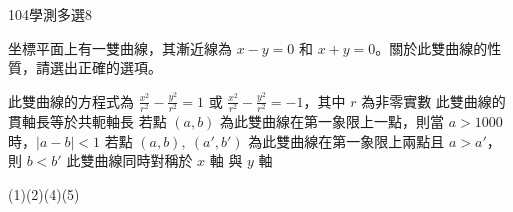     \begin{QUESTION}
        \begin{ExamInfo}{104}{學測}{多選}{8}
        \end{ExamInfo}
        \begin{ExamAnsRateInfo}{48}{71}{49}{24}
        \end{ExamAnsRateInfo}
        \begin{QBODY}
            坐標平面上有一雙曲線，其漸近線為 $x-y=0$ 和 $x+y=0$。關於此雙曲線的性質，請選出正確的選項。
			\begin{QOPS}
				\QOP 此雙曲線的方程式為 $\frac{{{x}^{2}}}{{{r}^{2}}}-\frac{{{y}^{2}}}{{{r}^{2}}}=1$ 或 $\frac{{{x}^{2}}}{{{r}^{2}}}-\frac{{{y}^{2}}}{{{r}^{2}}}=-1$，其中 $r$ 為非零實數
				\QOP 此雙曲線的貫軸長等於共軛軸長
				\QOP 若點 $\left( a,b \right)$ 為此雙曲線在第一象限上一點，則當 $a>1000$ 時，$\left| a-b \right|<1$
				\QOP 若點 $\left( a,b \right),\ \left( a',b' \right)$ 為此雙曲線在第一象限上兩點且 $a>a'$，則 $b<b'$
				\QOP 此雙曲線同時對稱於 $x$ 軸 與 $y$ 軸
			\end{QOPS}
        \end{QBODY}
        \begin{QFROMS}
        \end{QFROMS}
        \begin{QTAGS}\end{QTAGS}
        \begin{QANS}
            (1)(2)(4)(5)
        \end{QANS}
        \begin{QSOLLIST}
        \end{QSOLLIST}
        \begin{QEMPTYSPACE}
        \end{QEMPTYSPACE}
    \end{QUESTION}
